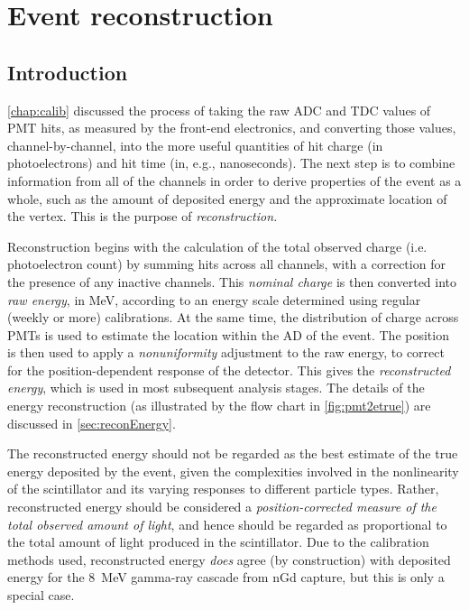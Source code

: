 \documentclass[../thesis.tex]{subfiles}
\begin{document}
\chapter{Event reconstruction}
\label{chap:recon}

\section{Introduction}
\label{sec:reconIntro}

\autoref{chap:calib} discussed the process of taking the raw ADC and TDC values of PMT hits, as measured by the front-end electronics, and converting those values, channel-by-channel, into the more useful quantities of hit charge (in photoelectrons) and hit time (in, e.g., nanoseconds). The next step is to combine information from all of the channels in order to derive properties of the event as a whole, such as the amount of deposited energy and the approximate location of the vertex. This is the purpose of \emph{reconstruction.}

Reconstruction begins with the calculation of the total observed charge (i.e. photoelectron count) by summing hits across all channels, with a correction for the presence of any inactive channels. This \emph{nominal charge} is then converted into \emph{raw energy}, in MeV, according to an energy scale determined using regular (weekly or more) calibrations. At the same time, the distribution of charge across PMTs is used to estimate the location within the AD of the event. The position is then used to apply a \emph{nonuniformity} adjustment to the raw energy, to correct for the position-dependent response of the detector. This gives the \emph{reconstructed energy}, which is used in most subsequent analysis stages. The details of the energy reconstruction (as illustrated by the flow chart in \autoref{fig:pmt2etrue}) are discussed in \autoref{sec:reconEnergy}.

The reconstructed energy should not be regarded as the best estimate of the true energy deposited by the event, given the complexities involved in the nonlinearity of the scintillator and its varying responses to different particle types. Rather, reconstructed energy should be considered a \emph{position-corrected measure of the total observed amount of light}, and hence should be regarded as proportional to the total amount of light produced in the scintillator. Due to the calibration methods used, reconstructed energy \emph{does} agree (by construction) with deposited energy for the 8~MeV gamma-ray cascade from nGd capture, but this is only a special case.
\end{document}
